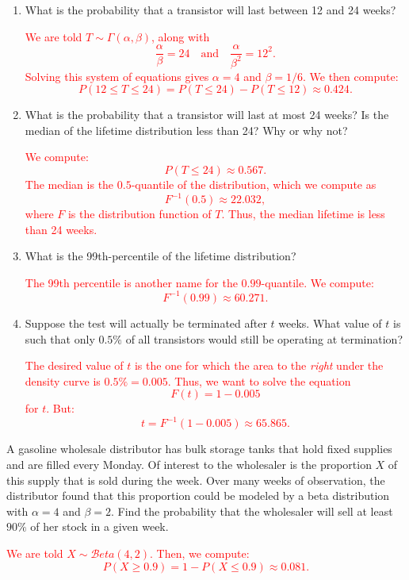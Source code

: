 \documentclass[12pt,reqno]{amsart}
\begin{document}
\medskip
\begin{enumerate}
\item What is the probability that a transistor will last between 12 and 24 weeks?

\bigskip
\textcolor{red}{We are told $T\sim \Gamma(\alpha,\beta)$, along with
	\[\frac{\alpha}{\beta} = 24 \quad \text{and} \quad \frac{\alpha}{\beta^2} = 12^2.
	\]
Solving this system of equations gives $\alpha = 4$ and $\beta = 1/6$. We then compute:
	\[P(12 \leq T \leq 24) = P(T\leq 24) - P(T\leq 12) \approx 0.424.
	\]}
\bigskip

\item What is the probability that a transistor will last at most 24 weeks? Is the median of the lifetime distribution less than 24? Why or why not?

\bigskip
\textcolor{red}{We compute:
	\[P(T \leq 24) \approx 0.567.
	\]
The median is the $0.5$-quantile of the distribution, which we compute as
	\[F^{-1}(0.5) \approx 22.032,
	\]
where $F$ is the distribution function of $T$. Thus, the median lifetime is less than 24 weeks.}
\bigskip

\item What is the 99th-percentile of the lifetime distribution?

\bigskip
\textcolor{red}{The 99th percentile is another name for the $0.99$-quantile. We compute:
	\[F^{-1}(0.99) \approx 60.271.
	\]}
\bigskip

\item Suppose the test will actually be terminated after $t$ weeks. What value of $t$ is such that only $0.5\%$ of all transistors would still be operating at termination?

\bigskip
\textcolor{red}{The desired value of $t$ is the one for which the area to the \textit{right} under the density curve is $0.5\% = 0.005$. Thus, we want to solve the equation
	\[F(t) = 1 - 0.005
	\]
for $t$. But:
	\[t = F^{-1}(1-0.005) \approx 65.865.
	\]}

\end{enumerate}










\bigskip
\prob A gasoline wholesale distributor has bulk storage tanks that hold fixed supplies and are filled every Monday. Of interest to the wholesaler is the proportion $X$ of this supply that is sold during the week. Over many weeks of observation, the distributor found that this proportion could be modeled by a beta distribution with $\alpha = 4$ and $\beta = 2$. Find the probability that the wholesaler will sell at least $90\%$ of her stock in a given week.


\bigskip
\textcolor{red}{We are told $X\sim \mathcal{B}eta(4,2)$. Then, we compute:
	\[P(X\geq 0.9) = 1- P(X\leq 0.9) \approx 0.081.
	\]}
\end{document}
